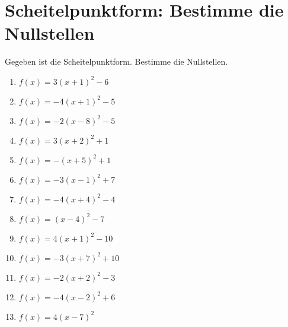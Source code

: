 \documentclass{article}%
\begin{document}
\section{Scheitelpunktform: Bestimme die Nullstellen}%
\label{sec:ScheitelpunktformBestimmedieNullstellen}%
Gegeben ist die Scheitelpunktform. Bestimme die Nullstellen.%
\begin{enumerate}[label=\alph*)]%
\item%
\newline\vspace{0.5cm} $f(x)=3(x+1)^2 -6$%
\item%
\newline\vspace{0.5cm} $f(x)=-4(x+1)^2 -5$%
\item%
\newline\vspace{0.5cm} $f(x)=-2(x-8)^2 -5$%
\item%
\newline\vspace{0.5cm} $f(x)=3(x+2)^2 +1$%
\item%
\newline\vspace{0.5cm} $f(x)=-(x+5)^2 +1$%
\item%
\newline\vspace{0.5cm} $f(x)=-3(x-1)^2 +7$%
\item%
\newline\vspace{0.5cm} $f(x)=-4(x+4)^2 -4$%
\item%
\newline\vspace{0.5cm} $f(x)=(x-4)^2 -7$%
\item%
\newline\vspace{0.5cm} $f(x)=4(x+1)^2 -10$%
\item%
\newline\vspace{0.5cm} $f(x)=-3(x+7)^2 +10$%
\item%
\newline\vspace{0.5cm} $f(x)=-2(x+2)^2 -3$%
\item%
\newline\vspace{0.5cm} $f(x)=-4(x-2)^2 +6$%
\item%
\newline\vspace{0.5cm} $f(x)=4(x-7)^2$%

\end{enumerate}
\end{document}
